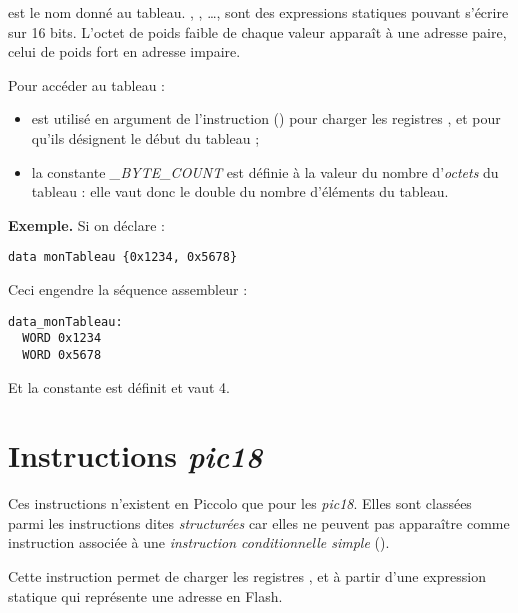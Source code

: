  est le nom donné au tableau. , , …, sont des expressions statiques pouvant s'écrire sur 16 bits. L'octet de poids faible de chaque valeur apparaît à une adresse paire, celui de poids fort en adresse impaire.

Pour accéder au tableau :
\begin{itemize}
  \item {} est utilisé en argument de l'instruction  () pour charger les registres ,  et  pour qu'ils désignent le début du tableau ;
  \item la constante \emph{\small{\_BYTE\_COUNT}} est définie à la valeur du nombre d'\emph{octets} du tableau : elle vaut donc le double du nombre d'éléments du tableau.
\end{itemize}



\textbf{Exemple.} Si on déclare :
\begin{lstlisting}[language=piccolo]
  data monTableau {0x1234, 0x5678}
\end{lstlisting}

Ceci engendre la séquence assembleur :

\begin{lstlisting}[language=assembleur]
data_monTableau:
  WORD 0x1234
  WORD 0x5678
\end{lstlisting}

Et la constante  est définit et vaut 4.



\section{Instructions \emph{pic18}}

Ces instructions n'existent en Piccolo que pour les \emph{pic18}. Elles sont classées parmi les instructions dites \emph{structurées} car elles ne peuvent pas apparaître comme instruction associée à une \emph{instruction conditionnelle simple} ().




Cette instruction permet de charger les registres ,  et  à partir d'une expression statique qui représente une adresse en Flash.

